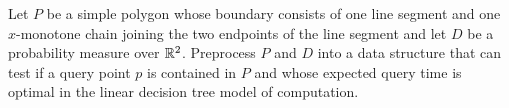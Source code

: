 \documentclass[charterfonts,lotsofwhite]{patmorin}
\begin{document}
\begin{op}
Let $P$ be a simple polygon whose
boundary consists of one line segment and one $x$-monotone chain
joining the two endpoints of the line segment and let $D$ be a
probability measure over $\mathbb{R}^2$. Preprocess $P$ and $D$ into a data
structure that can test if a query point $p$ is contained in $P$ and
whose expected query time is optimal in the linear decision tree model
of computation.
\end{op}



\end{document}
